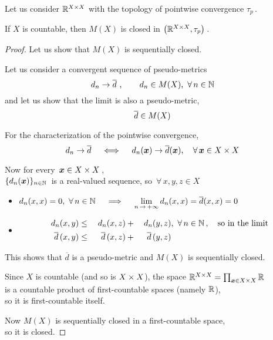 \documentclass[./main.tex]{subfiles}
\begin{document}
Let us consider $\mathbb{R}^{X \times X}$ with the topology of pointwise convergence $\tau_p \,$.

\begin{proposition}
    If $X$ is countable\footnotemark, then $M(X)$ is closed in $\bigl( \mathbb{R}^{X \times X}, \tau_p \bigr) \,$.
    
\end{proposition}
\begin{proof}
    Let us show that $M(X)$ is sequentially closed.

    Let us consider a convergent sequence of pseudo-metrics
    \[ d_n \to \overline{d}\ , \qquad d_n \in M(X),\ \forall\, n \in \N \]
    and let us show that the limit is also a pseudo-metric,
    \[ \overline{d} \in  M(X) \nospblw \]
    
    For the characterization of the pointwise convergence,
    \[ d_n \to \overline{d} \quad \iff \quad  d_n(\bm{x}) \to \overline{d}(\bm{x}), \quad \forall\, \bm{x} \in \XX \nospblw \]
    
    Now for every $\, \bm{x} \in {X \times X} \,$, \\[2pt]
    \bsp $\{ d_n(\bm{x}) \}_{n \in \mathbb{N}} \,$ is a real-valued sequence, so $\, \forall\, x,y,z \in X \,$
    \begin{itemize}
        \item $\displaystyle d_n(x,x) = 0,\ \forall\,n \in \N \quad \implies \quad \lim_{n \,\to\, +\infty} d_n(x,x) = \overline{d}(x,x) = 0$
        \item \begin{fleqn} \equp
        \begin{alignat*}{3}
            d_n(x,y) &{}\leq{}& d_n(x,z) &{}+{}& d_n(y,z) &,\ \forall\, n \in \mathbb{N} \,, \quad \text{so in the limit} \\
            \overline{d}\,(x,y) &{}\leq{}& \overline{d}\,(x,z) &{}+{}& \overline{d}\,(y,z)&
        \end{alignat*}
        \end{fleqn}
    \end{itemize}\vspace{-\parskip}
    This shows that $\overline{d}$ is a pseudo-metric and $M(X)$ is sequentially closed.
    
    Since $X$ is countable (and so is ${X \times X}$), the space $\mathbb{R}^{X \times X} = \prod_{\bm{x} \in {X \times X}} \mathbb{R}$ \\
    \bsp is a countable product of first-countable spaces (namely $\mathbb{R}$), \\ so it is first-countable itself.

    Now $M(X)$ is sequentially closed in a first-countable space, \\
    \bsp so it is closed.
\end{proof}
\end{document}
